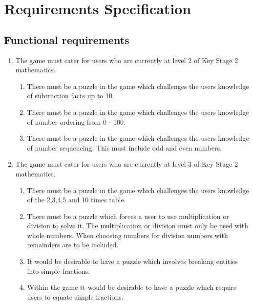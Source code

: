 \chapter{Requirements Specification}

\section{Functional requirements}
\begin{enumerate}

	\item The game must cater for users who are currently at level 2 of Key Stage 2 mathematics.
	\begin{enumerate}[label={1.\arabic*},nolistsep,leftmargin=*]
		\item There must be a puzzle in the game which challenges the users knowledge of subtraction facts up to 10.
		\item There must be a puzzle in the game which challenges the users knowledge of number ordering from 0 - 100.
		\item There must be a puzzle in the game which challenges the users knowledge of number sequencing. This must include odd and even numbers.
	\end{enumerate}

	\item The game must cater for users who are currently at level 3 of Key Stage 2 mathematics.
	\begin{enumerate}[label={2.\arabic*},nolistsep,leftmargin=*]
		\item There must be a puzzle in the game which challenges the users knowledge of the 2,3,4,5 and 10 times table.
		\item There must be a puzzle which forces a user to use multiplication or division to solve it. The multiplication or division must only be used with whole numbers. When choosing numbers for division numbers with remainders are to be included.	
		\item It would be desirable to have a puzzle which involves breaking entities into simple fractions.
		\item Within the game tt would be desirable to have a puzzle which require users to equate simple fractions.
	\end{enumerate}
	

\end{enumerate}
